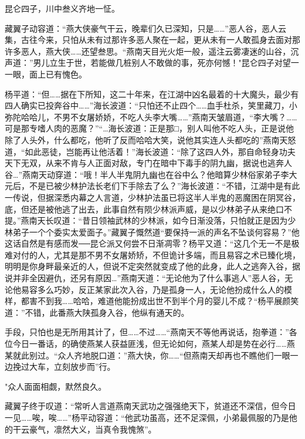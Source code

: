 \documentclass[12pt,oneside]{book}
\begin{document}
昆仑四子，川中叁义齐地一怔。

藏翼子动容道：``燕大侠豪气干云，晚辈们久已深知，只是\ldots\ldots{}''恶人谷，恶人云集，古往今来，只怕从未有过那许多恶人聚在一起，更从未有一人敢孤身去面对那许多恶人，燕大侠\ldots\ldots 还望叁思。``燕南天目光火炬一般，遥注云雾凄迷的山谷，沉声道：''男儿立生于世，若能做几桩别人不敢做的事，死亦何憾！"昆仑四子对望一一眼，面上已有愧色。

杨平道：``但\ldots\ldots 据在下所知，这二十年来，在江湖中凶名最着的十大魔头，最少有四人确实已投奔谷中\ldots\ldots{}''海长波道：``只怕还不止四个\ldots\ldots 血手杜杀，笑里藏刀，小弥陀哈哈儿，不男不女屠娇娇，不吃人头李大嘴\ldots\ldots{}''燕南天皱眉道，``李大嘴？\ldots\ldots 可是那专嗜人肉的恶魔？''``\ldots 海长波道：正是那□，别人叫他不吃人头，正是说他除了人头外，什么都吃，他听了反而哈哈大笑，说他其实连人头都吃的''燕南天怒道，``如此恶徒，岂能再让他活着！''海长波道：``除了这四人外，那自命轻身功夫天下无双，从来不肯与人正面对敌，专门在暗中下毒手的阴九幽，据说也逃奔人谷\ldots{}''燕南天动穿道：``哦！半人半鬼阴九幽也在谷中么？他暗算少林俗家弟子李大元后，不是已被少林护法长老们下手除去了么？''海长波道：``不错，江湖中是有此一传说，但据深悉内幕之人言道，少林护法虽已将这半人半鬼的恶魔困在阴冥谷，底，但还是被他逃了出去，此事自然有陨少林派声威，是以少林弟子从来绝口不提。''燕南天长叹道：``昔日领袖武林的少林派，如今日渐没落，只怕就正是因为少林弟子一个个委实太爱面子。''藏翼子慨然道``要保持一派的声名不坠谈何容易？''他这话自然是有感而发──昆仑派又何尝不日渐凋零？杨平又道：``这几个无一不是极难对付的人，尤其是那不男不女屠娇矫，不但诡计多端，而且易容之术已臻化境，明明是你身畔最亲近的人，但说不定突然就变成了他的此身，此人之逃奔入谷，据说并非全因避仇，还另有原因\ldots{}''燕南天道：``无论他为了什么事逃人''恶人谷，无论他易容多么巧妙，反正某家此次入谷，乃是孤身一人，无论他扮成什么人的模样，都害不到我\ldots\ldots 哈哈，难道他能扮成出世不到半个月的婴儿不成？``杨平展颜笑道：''不错，此番燕大陕孤身入谷，他纵有通天的。

手段，只怕也是无所用其计了，但\ldots\ldots 不过\ldots\ldots{}``燕南天不等他再说话，抱拳道：''各位今日一番话，的确使燕某人获益匪浅，但无论如何，燕某人却是势在必行\ldots\ldots 燕某就此别过。``众人齐地脱口道：''燕大快，你\ldots\ldots{}``但燕南天却再也不瞧他们一眼一边挽过大车，立刻放步而''行。

"众人面面相觑，默然良久。

藏翼子终于叹道：``常听人言道燕南天武功之强强绝天下，贫道还不深信，但今日一见\ldots\ldots 唉，唉\ldots\ldots{}''杨平动容道：``他武功虽高，还不足深佩，小弟最佩服的乃是他的干云豪气，凛然大义，当真令我愧煞''。
\end{document}
